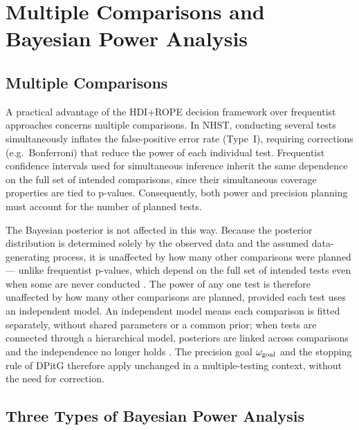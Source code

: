 \section{Multiple Comparisons and Bayesian Power Analysis}\label{app:multiple_comparisons}

\subsection*{Multiple Comparisons}

A practical advantage of the HDI+ROPE decision framework over frequentist approaches concerns
multiple comparisons. In NHST, conducting several tests simultaneously inflates the
false-positive error rate (Type~I), requiring corrections (e.g.\ Bonferroni) that reduce the power of
each individual test. Frequentist confidence intervals used for simultaneous inference inherit the same
dependence on the full set of intended comparisons, since their simultaneous coverage
properties are tied to p-values. Consequently, both power and precision planning must account for the number
of planned tests.

The Bayesian posterior is not affected in this way. Because the posterior distribution
is determined solely by the observed data and the assumed data-generating process, it
is unaffected by how many other comparisons were planned --- unlike frequentist
p-values, which depend on the full set of intended tests even when some are never
conducted \citep{gelman2012, kruschke2015doing}.
The power of any one test is therefore unaffected by how many other comparisons are
planned, provided each test uses an independent model.
An independent model means each comparison is fitted separately, without shared
parameters or a common prior; when tests are connected through a hierarchical model,
posteriors are linked across comparisons and the independence no longer holds
\citep{gelman2012}.
The precision goal $\omega_{\rm goal}$ and the stopping rule of DPitG therefore apply
unchanged in a multiple-testing context, without the need for correction.

\subsection*{Three Types of Bayesian Power Analysis}

